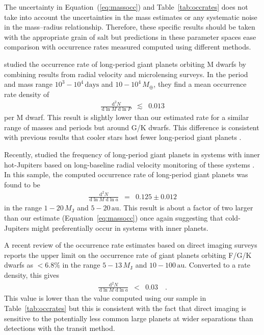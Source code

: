 \documentclass[manuscript, letterpaper]{aastex6}
\renewcommand{\eqref}[1]{\ref{eq:#1}}
\newcommand{\Eq}[1]{Equation~(\eqref{#1})}
\newcommand{\eq}[1]{\Eq{#1}}
\newcommand{\eqalt}[1]{Equation~\eqref{#1}}
\newcommand{\dd}{\ensuremath{\,\mathrm{d}}}
\newcommand{\unit}[1]{{\ensuremath{\,\mathrm{#1}}}}
\begin{document}
The uncertainty in \eq{massocc} and Table~\ref{tab:occrates} does not take
into account the uncertainties in the mass estimates or any systematic noise
in the mass--radius relationship.
Therefore, these specific results should be taken with the appropriate grain
of salt but predictions in these parameter spaces ease comparison with
occurrence rates measured computed using different methods.

\citet{Clanton:2014} studied the occurrence rate of long-period giant planets
orbiting M dwarfs by combining results from radial velocity and microlensing
surveys.
In the period and mass range $10^3-10^4\unit{days}$ and $10-10^4\,M_\oplus$,
they find a mean occurrence rate density of
\begin{eqnarray}
\frac{\dd^2 N}{\dd\ln M\,\dd\ln P} &\lesssim& 0.013
\end{eqnarray}
per M dwarf.
This result is slightly lower than our estimated rate for a similar range of
masses and periods but around G/K dwarfs.
This difference is consistent with previous results that cooler stars host
fewer long-period giant planets \citep[for example][]{Cumming:2008}.

Recently, \citet{Bryan:2016} studied the frequency of long-period giant
planets in systems with inner hot-Jupiters based on long-baseline radial
velocity monitoring of these systems \citep{Knutson:2014}.
In this sample, the computed occurrence rate of long-period giant planets was
found to be
\begin{eqnarray}
\frac{\dd^2 N}{\dd\ln M\,\dd\ln a} &=& 0.125 \pm 0.012
\end{eqnarray}
in the range $1-20\,M_\mathrm{J}$ and $5-20\unit{au}$.
This result is about a factor of two larger than our estimate
(\eqalt{massocc}) once again suggesting that cold-Jupiters might
preferentially occur in systems with inner planets.

A recent review of the occurrence rate estimates based on direct imaging
surveys \citep{Bowler:2016} reports the upper limit on the occurrence rate of
giant planets orbiting F/G/K dwarfs as $<6.8\%$ in the range
$5-13\,M_\mathrm{J}$ and $10-100\unit{au}$.
Converted to a rate density, this gives
\begin{eqnarray}
\frac{\dd^2 N}{\dd\ln M\,\dd\ln a} &<& 0.03 \quad.
\end{eqnarray} This value is lower than the value computed using our sample in
Table~\ref{tab:occrates} but this is consistent with the fact that direct
imaging is sensitive to the potentially less common large planets at wider
separations than detections with the transit method.
\end{document}
